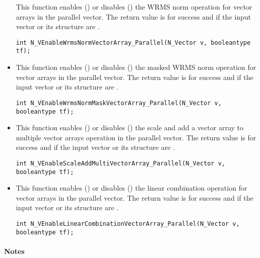 \begin{itemize}
This function enables () or disables () the WRMS norm
operation for vector arrays in the parallel vector. The return value is  for
success and  if the input vector or its  structure are .

\verb|int N_VEnableWrmsNormVectorArray_Parallel(N_Vector v, booleantype tf);|


\item {}

This function enables () or disables () the masked WRMS
norm operation for vector arrays in the parallel vector. The return value is
 for success and  if the input vector or its  structure are
.

\verb|int N_VEnableWrmsNormMaskVectorArray_Parallel(N_Vector v, booleantype tf);|


\item {}

This function enables () or disables () the scale and
add a vector array to multiple vector arrays operation in the parallel vector. The
return value is  for success and  if the input vector or its
 structure are .

\verb|int N_VEnableScaleAddMultiVectorArray_Parallel(N_Vector v, booleantype tf);|


\item {}

This function enables () or disables () the linear
combination operation for vector arrays in the parallel vector. The return value
is  for success and  if the input vector or its  structure
are .

\verb|int N_VEnableLinearCombinationVectorArray_Parallel(N_Vector v, booleantype tf);|

\end{itemize}
\paragraph{\bf Notes} 
           
